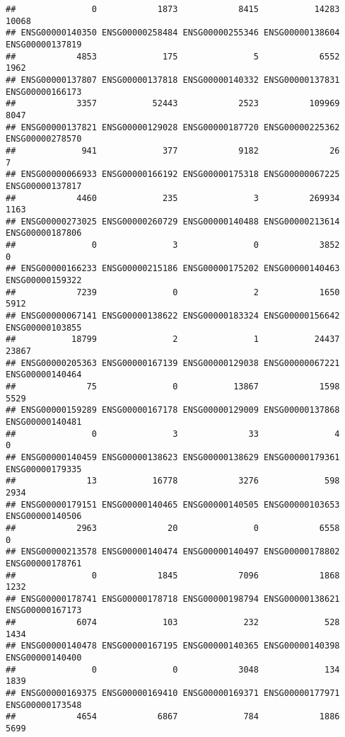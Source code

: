 \documentclass[
]{article}
\begin{document}
\begin{verbatim}
##               0            1873            8415           14283           10068 
## ENSG00000140350 ENSG00000258484 ENSG00000255346 ENSG00000138604 ENSG00000137819 
##            4853             175               5            6552            1962 
## ENSG00000137807 ENSG00000137818 ENSG00000140332 ENSG00000137831 ENSG00000166173 
##            3357           52443            2523          109969            8047 
## ENSG00000137821 ENSG00000129028 ENSG00000187720 ENSG00000225362 ENSG00000278570 
##             941             377            9182              26               7 
## ENSG00000066933 ENSG00000166192 ENSG00000175318 ENSG00000067225 ENSG00000137817 
##            4460             235               3          269934            1163 
## ENSG00000273025 ENSG00000260729 ENSG00000140488 ENSG00000213614 ENSG00000187806 
##               0               3               0            3852               0 
## ENSG00000166233 ENSG00000215186 ENSG00000175202 ENSG00000140463 ENSG00000159322 
##            7239               0               2            1650            5912 
## ENSG00000067141 ENSG00000138622 ENSG00000183324 ENSG00000156642 ENSG00000103855 
##           18799               2               1           24437           23867 
## ENSG00000205363 ENSG00000167139 ENSG00000129038 ENSG00000067221 ENSG00000140464 
##              75               0           13867            1598            5529 
## ENSG00000159289 ENSG00000167178 ENSG00000129009 ENSG00000137868 ENSG00000140481 
##               0               3              33               4               0 
## ENSG00000140459 ENSG00000138623 ENSG00000138629 ENSG00000179361 ENSG00000179335 
##              13           16778            3276             598            2934 
## ENSG00000179151 ENSG00000140465 ENSG00000140505 ENSG00000103653 ENSG00000140506 
##            2963              20               0            6558               0 
## ENSG00000213578 ENSG00000140474 ENSG00000140497 ENSG00000178802 ENSG00000178761 
##               0            1845            7096            1868            1232 
## ENSG00000178741 ENSG00000178718 ENSG00000198794 ENSG00000138621 ENSG00000167173 
##            6074             103             232             528            1434 
## ENSG00000140478 ENSG00000167195 ENSG00000140365 ENSG00000140398 ENSG00000140400 
##               0               0            3048             134            1839 
## ENSG00000169375 ENSG00000169410 ENSG00000169371 ENSG00000177971 ENSG00000173548 
##            4654            6867             784            1886            5699 

\end{verbatim}
\end{document}
